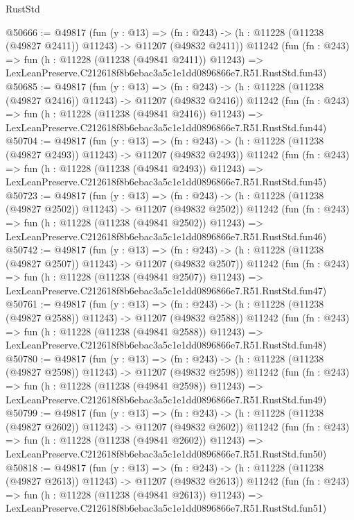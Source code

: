 \begin{lexlean}{RustStd}
\begin{coremodule}
@50666 := @49817
    (fun (y : @13) =>
    (fn : @243) -> (h : @11228 (@11238 (@49827 @2411)) @11243) -> @11207 (@49832 @2411))
    @11242
    (fun (fn : @243) =>
    fun (h : @11228 (@11238 (@49841 @2411)) @11243) =>
    LexLeanPreserve.C212618f8b6ebac3a5c1e1dd0896866e7.R51.RustStd.fun43)
@50685 := @49817
    (fun (y : @13) =>
    (fn : @243) -> (h : @11228 (@11238 (@49827 @2416)) @11243) -> @11207 (@49832 @2416))
    @11242
    (fun (fn : @243) =>
    fun (h : @11228 (@11238 (@49841 @2416)) @11243) =>
    LexLeanPreserve.C212618f8b6ebac3a5c1e1dd0896866e7.R51.RustStd.fun44)
@50704 := @49817
    (fun (y : @13) =>
    (fn : @243) -> (h : @11228 (@11238 (@49827 @2493)) @11243) -> @11207 (@49832 @2493))
    @11242
    (fun (fn : @243) =>
    fun (h : @11228 (@11238 (@49841 @2493)) @11243) =>
    LexLeanPreserve.C212618f8b6ebac3a5c1e1dd0896866e7.R51.RustStd.fun45)
@50723 := @49817
    (fun (y : @13) =>
    (fn : @243) -> (h : @11228 (@11238 (@49827 @2502)) @11243) -> @11207 (@49832 @2502))
    @11242
    (fun (fn : @243) =>
    fun (h : @11228 (@11238 (@49841 @2502)) @11243) =>
    LexLeanPreserve.C212618f8b6ebac3a5c1e1dd0896866e7.R51.RustStd.fun46)
@50742 := @49817
    (fun (y : @13) =>
    (fn : @243) -> (h : @11228 (@11238 (@49827 @2507)) @11243) -> @11207 (@49832 @2507))
    @11242
    (fun (fn : @243) =>
    fun (h : @11228 (@11238 (@49841 @2507)) @11243) =>
    LexLeanPreserve.C212618f8b6ebac3a5c1e1dd0896866e7.R51.RustStd.fun47)
@50761 := @49817
    (fun (y : @13) =>
    (fn : @243) -> (h : @11228 (@11238 (@49827 @2588)) @11243) -> @11207 (@49832 @2588))
    @11242
    (fun (fn : @243) =>
    fun (h : @11228 (@11238 (@49841 @2588)) @11243) =>
    LexLeanPreserve.C212618f8b6ebac3a5c1e1dd0896866e7.R51.RustStd.fun48)
@50780 := @49817
    (fun (y : @13) =>
    (fn : @243) -> (h : @11228 (@11238 (@49827 @2598)) @11243) -> @11207 (@49832 @2598))
    @11242
    (fun (fn : @243) =>
    fun (h : @11228 (@11238 (@49841 @2598)) @11243) =>
    LexLeanPreserve.C212618f8b6ebac3a5c1e1dd0896866e7.R51.RustStd.fun49)
@50799 := @49817
    (fun (y : @13) =>
    (fn : @243) -> (h : @11228 (@11238 (@49827 @2602)) @11243) -> @11207 (@49832 @2602))
    @11242
    (fun (fn : @243) =>
    fun (h : @11228 (@11238 (@49841 @2602)) @11243) =>
    LexLeanPreserve.C212618f8b6ebac3a5c1e1dd0896866e7.R51.RustStd.fun50)
@50818 := @49817
    (fun (y : @13) =>
    (fn : @243) -> (h : @11228 (@11238 (@49827 @2613)) @11243) -> @11207 (@49832 @2613))
    @11242
    (fun (fn : @243) =>
    fun (h : @11228 (@11238 (@49841 @2613)) @11243) =>
    LexLeanPreserve.C212618f8b6ebac3a5c1e1dd0896866e7.R51.RustStd.fun51)

\end{coremodule}
\end{lexlean}
